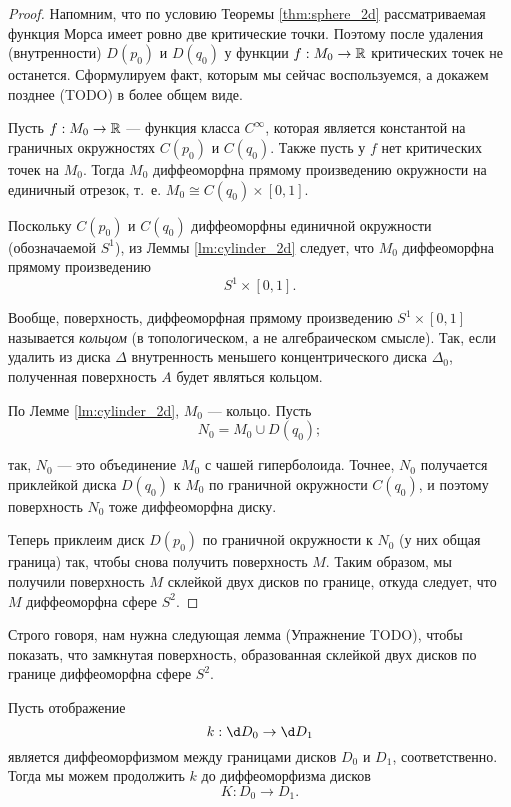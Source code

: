 \documentclass[a4paper,12pt,openany,leqno]{extbook}
\begin{document}
\begin{proof}
Напомним, что по условию Теоремы \ref{thm:sphere_2d} рассматриваемая функция Морса имеет ровно две критические точки. Поэтому после удаления (внутренности) $D(p_0)$ и $D(q_0)$ у функции $f: M_0 \to \mathbb{R}$ критических точек не останется. Сформулируем факт, которым мы сейчас воспользуемся, а докажем позднее (TODO) в более общем виде.

\begin{lemma}
Пусть $f: M_0 \to \mathbb{R}$ --- функция класса $C^{\infty}$, которая является константой на граничных окружностях $C(p_0)$ и $C(q_0)$. Также пусть у $f$ нет критических точек на $M_0$. Тогда $M_0$ диффеоморфна прямому произведению окружности на единичный отрезок, т.~е. $M_0 \cong C(q_0) \times [0, 1]$.
\label{lm:cylinder_2d}
\end{lemma}

Поскольку $C(p_0)$ и $C(q_0)$ диффеоморфны единичной окружности (обозначаемой $S^1$), из Леммы \ref{lm:cylinder_2d} следует, что $M_0$ диффеоморфна прямому произведению
\[
S^1 \times [0, 1].
\]

Вообще, поверхность, диффеоморфная прямому произведению $S^1 \times [0, 1]$ называется \emph{кольцом} (в топологическом, а не алгебраическом смысле). Так, если удалить из диска $\Delta$ внутренность меньшего концентрического диска $\Delta_0$, полученная поверхность $A$ будет являться кольцом.

По Лемме \ref{lm:cylinder_2d}, $M_0$ --- кольцо. Пусть
\[
N_0 = M_0 \cup D(q_0);
\]

так, $N_0$ --- это объединение $M_0$ с чашей гиперболоида. Точнее, $N_0$ получается приклейкой диска $D(q_0)$ к $M_0$ по граничной окружности $C(q_0)$, и поэтому поверхность $N_0$ тоже диффеоморфна диску.

Теперь приклеим диск $D(p_0)$ по граничной окружности к $N_0$ (у них общая граница) так, чтобы снова получить поверхность $M$. Таким образом, мы получили поверхность $M$ склейкой двух дисков по границе, откуда следует, что $M$ диффеоморфна сфере $S^2$.
\end{proof}

Строго говоря, нам нужна следующая лемма (Упражнение TODO), чтобы показать, что замкнутая поверхность, образованная склейкой двух дисков по границе диффеоморфна сфере $S^2$.

\begin{lemma}
Пусть отображение
\begin{equation}
k: \d D_0 \to \d D_1
\end{equation}
является диффеоморфизмом между границами дисков $D_0$ и $D_1$, соответственно. Тогда мы можем продолжить $k$ до диффеоморфизма дисков
\begin{equation}
K:D_0 \to D_1.
\end{equation}
\end{lemma}
\end{document}
